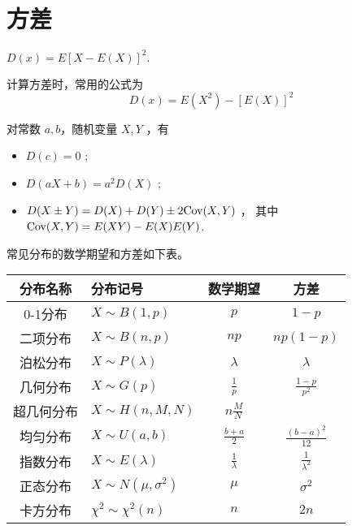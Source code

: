 \section{方差}

\begin{Def}[方差]

    $ D(x) = E[X-E(X)]^2. $ 
\end{Def}

计算方差时，常用的公式为$$
    D(x) = E(X^2) - [E(X)]^2
$$ 

对常数 $ a,b $，随机变量 $ X,Y $ ，有\begin{itemize}
    \item $ D(c) = 0 $ ;
    \item $ D(aX+b) = a^2D(X) $ ;
    \item $ D(X\pm Y) = D(X) + D(Y) \pm 2\textrm{Cov}(X,Y) $ ，
    其中 $ \textrm{Cov}(X,Y) = E(XY) - E(X)E(Y) $.
\end{itemize}

常见分布的数学期望和方差如下表。

\begin{table}[!htbp]\centering
    \begin{tabular}{clcc}
    \toprule
    分布名称  & 分布记号                  & 数学期望           & 方差                         \\ \midrule
    0-1分布   &$  X\sim B(1,p) $           & $ p   $             & $ 1-p    $               \\
    二项分布  & $ X\sim B(n,p)   $         & $ np   $            & $ np(1-p)  $             \\
    泊松分布  &$  X\sim P(\lambda) $       & $ \lambda    $      & $ \lambda    $           \\
    几何分布  & $ X \sim G(p)  $           & $ \frac 1p  $      & $ \frac{1-p}{p^2}  $    \\
    超几何分布 & $ X \sim H(n,M,N)    $     &$  n\frac MN  $     &                         \\
    均匀分布  & $ X\sim U(a,b) $           & $ \frac{b+a}2  $   &$  \frac{(b-a)^2}{12} $  \\
    指数分布  &$  X\sim E(\lambda)   $     & $ \frac1\lambda $  & $ \frac1{\lambda^2} $   \\
    正态分布  & $ X\sim N(\mu,\sigma^2) $  & $ \mu $             &$  \sigma^2    $          \\
    卡方分布  & $ \chi^2\sim \chi^2(n)  $  & $ n $               & $ 2n    $                \\ \bottomrule
    \end{tabular}
\end{table}

